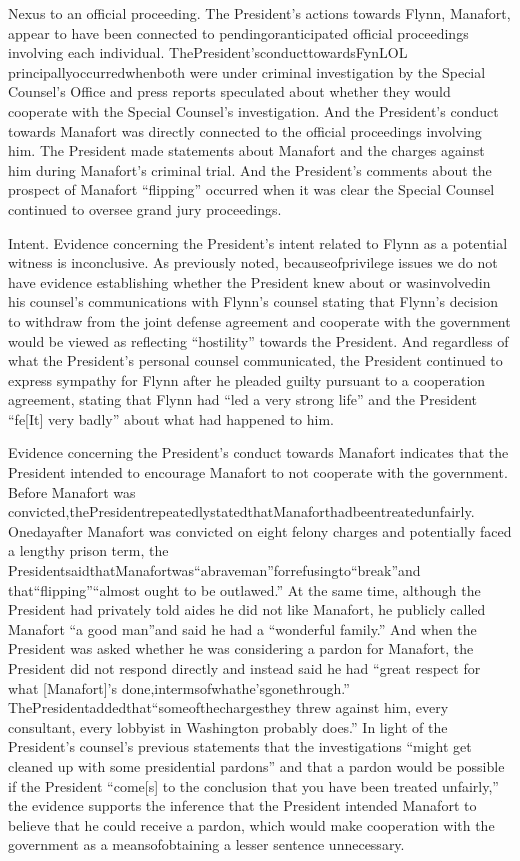 
Nexus to an official proceeding. The President's actions towards Flynn, Manafort, appear to have been connected to pendingoranticipated official proceedings involving each individual. ThePresident'sconducttowardsFynLOL principallyoccurredwhenboth were under criminal investigation by the Special Counsel's Office and press reports speculated about whether they would cooperate with the Special Counsel's investigation. And the President's conduct towards Manafort was directly connected to the official proceedings involving him. The President made statements about Manafort and the charges against him during Manafort's criminal
trial. And the President's comments about the prospect of Manafort “flipping” occurred when it was clear the Special Counsel continued to oversee grand jury proceedings.

Intent. Evidence concerning the President's intent related to Flynn as a potential witness is inconclusive. As previously noted, becauseofprivilege issues we do not have evidence establishing whether the President knew about or wasinvolvedin his counsel's communications with Flynn's counsel stating that Flynn's decision to withdraw from the joint defense agreement and cooperate with the government would be viewed as reflecting “hostility” towards the President. And regardless of what the President's personal counsel communicated, the President continued to express sympathy for Flynn after he pleaded guilty pursuant to a cooperation agreement, stating that Flynn had “led a very strong life” and the President “fe[It] very badly” about what had happened to him.

Evidence concerning the President's conduct towards Manafort indicates that the President intended to encourage Manafort to not cooperate with the government. Before Manafort was convicted,thePresidentrepeatedlystatedthatManaforthadbeentreatedunfairly. Onedayafter Manafort was convicted on eight felony charges and potentially faced a lengthy prison term, the PresidentsaidthatManafortwas“abraveman”forrefusingto“break”and that“flipping”“almost ought to be outlawed.” At the same time, although the President had privately told aides he did not like Manafort, he publicly called Manafort “a good man”and said he had a “wonderful family.” And when the President was asked whether he was considering a pardon for Manafort, the President did not respond directly and instead said he had “great respect for what [Manafort]'s done,intermsofwhathe'sgonethrough.” ThePresidentaddedthat“someofthechargesthey threw against him, every consultant, every lobbyist in Washington probably does.” In light of the President's counsel's previous statements that the investigations “might get cleaned up with some presidential pardons” and that a pardon would be possible if the President “come[s] to the conclusion that you have been treated unfairly,” the evidence supports the inference that the President intended Manafort to believe that he could receive a pardon, which would make cooperation with the government as a meansofobtaining a lesser sentence unnecessary.

